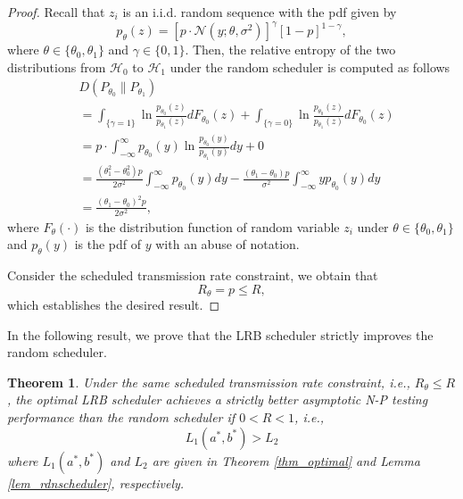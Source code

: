 \documentclass[journal]{IEEEtran}
\def\cH{\mathcal{H}}
\newtheorem{thm}{Theorem}
\begin{document}
\begin{proof}
Recall that $z_i$ is an i.i.d. random sequence with the pdf given by
\begin{equation}
{p_{{\theta}}}(z) = {\left[ p\cdot{\mathcal{N}(y; {\theta },\sigma^2 )} \right]^{\gamma }}{\left[ {1 - p} \right]^{1 - \gamma }},
\end{equation}
where $ \theta\in\{\theta_0, \theta_1\}$ and $\gamma\in\{0, 1\}$.
Then, the relative entropy of the two distributions  from $\cH_0$ to $\cH_1$ under the random scheduler is computed as follows
\begin{equation*}
\begin{split}
&D({P_{\theta_0}}\lVert{P_{\theta_1}})\\
&= \int_{\{\gamma = 1\}} {\ln\frac{{{p_{{\theta _0}}}(z)}}{{{p_{{\theta _1}}}(z)}}d{F_{{\theta _0}}}(z)}  + \int_{\{\gamma  = 0\}} {\ln\frac{{{p_{{\theta _0}}}(z)}}{{{p_{{\theta _1}}}(z)}}d{F_{{\theta _0}}}(z)}\\
&= p \cdot \int_{ - \infty }^\infty  {{p_{{\theta _0}}}(y){\ln}\frac{{{p_{{\theta _0}}}(y)}}{{{p_{{\theta _1}}}(y)}}dy}  + 0\\
&= \frac{{(\theta _1^2 - \theta _0^2)p}}{{2{\sigma ^2}}} \int_{ - \infty }^\infty  {{p_{{\theta _0}}}(y)dy}  - \frac{{({\theta _1} - {\theta _0})}p}{{{\sigma ^2}}} \int_{ - \infty }^\infty  {y{p_{{\theta _0}}}(y)dy} \\
&=\frac{{{{({\theta _1} - {\theta _0})}^2}}p}{{2{\sigma ^2}}},
\end{split}
\end{equation*}
where $F_{\theta}(\cdot)$ is the distribution function of random variable ${z_i}$ under $\theta\in\{\theta_0, \theta_1\}$ and $p_{\theta}(y)$ is the pdf of $y$ with an abuse of notation.

Consider the scheduled transmission rate constraint, we obtain that
\begin{equation}
R_\theta=p\leqslant R,
\end{equation}
which establishes the desired result.
\end{proof}
In the following result, we prove that the LRB scheduler strictly improves the random scheduler.
\begin{thm}Under the same scheduled transmission rate constraint, i.e., $R_\theta\leqslant R$, the optimal LRB scheduler achieves a strictly better asymptotic N-P testing performance than the random scheduler if $0<R<1$, i.e.,
$$
L_1(a^*,b^*)>L_2$$
where $L_1(a^*,b^*)$ and $L_2$ are given in Theorem \ref{thm_optimal} and Lemma \ref{lem_rdnscheduler}, respectively.
\end{thm}
\end{document}
